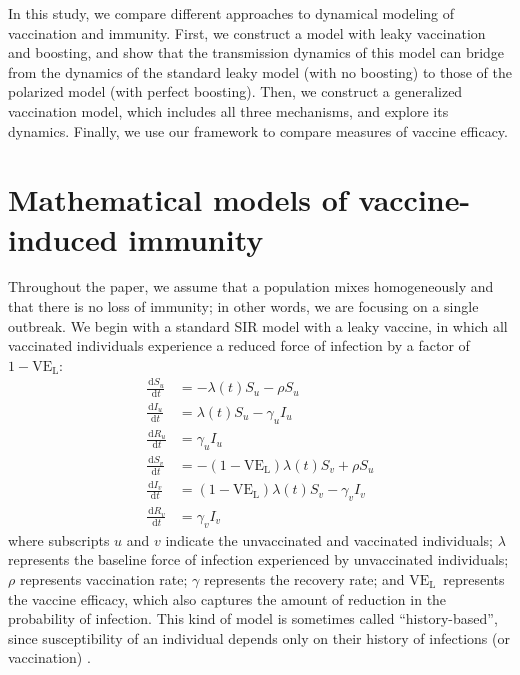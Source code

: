 \documentclass[12pt]{article}
\newcommand{\dd}[1]{\ensuremath{\, \mathrm{d}#1}}
\newcommand{\VE}{\ensuremath{\mathrm{VE}}}
\newcommand{\VEL}{\ensuremath{\VE_{\mathrm{L}}}}
\begin{document}
In this study, we compare different approaches to dynamical modeling of vaccination and immunity.
First, we construct a model with leaky vaccination and boosting, and show that the transmission dynamics of this model can bridge from the dynamics of the standard leaky model (with no boosting) to those of the polarized model (with perfect boosting). 
Then, we construct a generalized vaccination model, which includes all three mechanisms, and explore its dynamics.
Finally, we use our framework to compare measures of vaccine efficacy.

\section*{Mathematical models of vaccine-induced immunity}


Throughout the paper, we assume that a population mixes homogeneously and that there is no loss of immunity;
in other words, we are focusing on a single outbreak.
We begin with a standard SIR model with a leaky vaccine, in which all vaccinated individuals experience a reduced force of infection by a factor of $1-\VEL$:
\begin{align}
\frac{\dd S_u}{\dd t} &= - \lambda(t) S_u - \rho S_u \\
\frac{\dd I_u}{\dd t} &= \lambda(t) S_u - \gamma_u I_u \\
\frac{\dd R_u}{\dd t} &= \gamma_u I_u \\
\frac{\dd S_v}{\dd t} &= - (1-\VEL) \lambda(t) S_v + \rho S_u \\
\frac{\dd I_v}{\dd t} &= (1-\VEL) \lambda(t) S_v - \gamma_v I_v \\
\frac{\dd R_v}{\dd t} &= \gamma_v I_v
\end{align}
where subscripts $u$ and $v$ indicate the unvaccinated and vaccinated individuals;
$\lambda$ represents the baseline force of infection experienced by unvaccinated individuals; 
$\rho$ represents vaccination rate;
$\gamma$ represents the recovery rate;
and \VEL\ represents the vaccine efficacy, which also captures the amount of reduction in the probability of infection.
This kind of model is sometimes called “history-based”, since susceptibility of an individual depends only on their history of infections (or vaccination) \citep{gog2002dynamics,gog2002status,kucharski2016capturing}.
\end{document}
